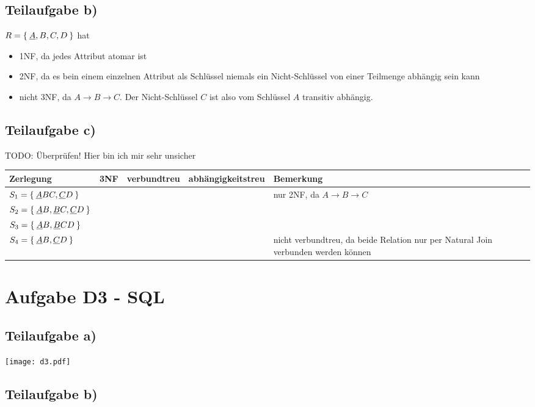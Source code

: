 \documentclass[a4paper,9pt]{scrartcl}
\newcommand{\cmark}{\ding{51}}%
\newcommand{\xmark}{\ding{55}}%
\begin{document}
\subsection{Teilaufgabe b)}
$R = \Set{\underline{A}, B, C, D}$ hat
\begin{itemize}
    \item 1NF, da jedes Attribut atomar ist
    \item 2NF, da es bein einem einzelnen Attribut als Schlüssel niemals ein Nicht-Schlüssel von einer Teilmenge abhängig sein kann
    \item nicht 3NF, da $A \rightarrow B \rightarrow C$. Der Nicht-Schlüssel $C$ ist also vom Schlüssel $A$ transitiv abhängig.
\end{itemize}

\subsection{Teilaufgabe c)}
TODO: Überprüfen! Hier bin ich mir sehr unsicher


\begin{tabular}{lcccp{5cm}}
    Zerlegung                                       & 3NF    & verbundtreu & abhängigkeitstreu & Bemerkung\\
    \hline
    $S_1 = \Set{\underline{A}BC, \underline{C}D}$   & \xmark & \cmark      & \cmark            & nur 2NF, da $A \rightarrow B \rightarrow C$\\
    $S_2 = \Set{\underline{A}B, \underline{B}C, \underline{C}D}$ & \cmark & \xmark & \cmark    & \\
    $S_3 = \Set{\underline{A}B, \underline{B}CD}$ & \cmark   & \cmark      & \cmark            & \\
    $S_4 = \Set{\underline{A}B, \underline{C}D}$  & \cmark   & \xmark      & \cmark            & nicht verbundtreu, da beide Relation nur per Natural Join verbunden werden können
\end{tabular}

\section{Aufgabe D3 - SQL}
\subsection{Teilaufgabe a)}
\texttt{[image: d3.pdf]}

\subsection{Teilaufgabe b)}
\inputminted[linenos, numbersep=5pt, tabsize=4]{sql}{d3b.sql}
\end{document}
